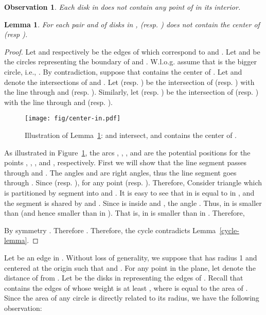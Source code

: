 \documentclass[11pt,a4paper]{article}
\newtheorem{lemma}{Lemma}
\newtheorem{observation}{Observation}
\begin{document}
\begin{observation}
\label{no-point-in-circle-obs}
 Each disk in  does not contain any point of  in its interior.
\end{observation}

\begin{lemma}
\label{center-in-lemma}
 For each pair  and  of disks in ,  (resp. ) does not contain the center of  (resp ).
\end{lemma}

\begin{proof}
 Let  and  respectively be the edges of  which correspond to  and . Let  and  be the circles representing the boundary of  and . W.l.o.g. assume that  is the bigger circle, i.e., . By contradiction, suppose that  contains the center  of . Let  and  denote the intersections of  and . Let  (resp. ) be the intersection of  (resp. ) with the line through  and  (resp. ). Similarly, let  (resp. ) be the intersection of  (resp. ) with the line through  and  (resp. ). 

\begin{figure}[htb]
  \centering
  \texttt{[image: fig/center-in.pdf]}
 \caption{Illustration of Lemma~\ref{center-in-lemma}:  and  intersect, and  contains the center of .}
  \label{center-in-fig}
\end{figure}

As illustrated in Figure~\ref{center-in-fig}, the arcs , , , and  are the potential positions for the points , , , and , respectively. First we will show that the line segment  passes through  and . The angles  and  are right angles, thus the line segment  goes through . Since  (resp. ), for any point  (resp. ). Therefore, 
Consider triangle  which is partitioned by segment  into  and . It is easy to see that  in  is equal to  in , and the segment  is shared by  and . Since  is inside  and , the angle . Thus,  in  is smaller than  (and hence smaller than  in ). That is,   in  is smaller than  in . Therefore,



By symmetry . Therefore . Therefore, the cycle  contradicts Lemma~\ref{cycle-lemma}.
\end{proof}

Let  be an edge in . Without loss of generality, we suppose that  has radius 1 and centered at the origin  such that  and . For any point  in the plane, let  denote the distance of  from . Let  be the disks in  representing the edges of . Recall that  contains the edges of  whose weight is at least , where  is equal to the area of . Since the area of any circle is directly related to its radius, we have the following observation:
\end{document}
